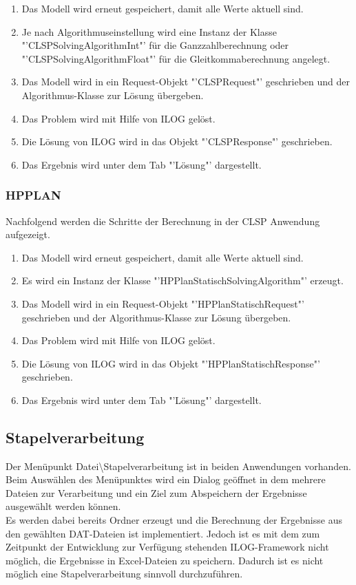 \documentclass[12pt,a4paper, listof=entryprefix, bibliography=totocnumbered,toc=listofnumbered,lof=listofnumbered]{scrartcl}
\begin{document}
\begin{enumerate}
	\item Das Modell wird erneut gespeichert, damit alle Werte aktuell sind.
	\item Je nach Algorithmuseinstellung wird eine Instanz der Klasse "'CLSPSolvingAlgorithmInt"' für die Ganzzahlberechnung oder "'CLSPSolvingAlgorithmFloat"' für die Gleitkommaberechnung angelegt.
	\item Das Modell wird in ein Request-Objekt "'CLSPRequest"' geschrieben und der Algorithmus-Klasse zur Lösung übergeben.
	\item Das Problem wird mit Hilfe von ILOG gelöst.
	\item Die Lösung von ILOG wird in das Objekt "'CLSPResponse"' geschrieben.
	\item Das Ergebnis wird unter dem Tab "'Lösung"' dargestellt.
\end{enumerate}

\subsubsection{HPPLAN}
Nachfolgend werden die Schritte der Berechnung in der CLSP Anwendung aufgezeigt.

\begin{enumerate}
	\item Das Modell wird erneut gespeichert, damit alle Werte aktuell sind.
	\item Es wird ein Instanz der Klasse "'HPPlanStatischSolvingAlgorithm"' erzeugt.
	\item Das Modell wird in ein Request-Objekt "'HPPlanStatischRequest"' geschrieben und der Algorithmus-Klasse zur Lösung übergeben.
	\item Das Problem wird mit Hilfe von ILOG gelöst.
	\item Die Lösung von ILOG wird in das Objekt "'HPPlanStatischResponse"' geschrieben.
	\item Das Ergebnis wird unter dem Tab "'Lösung"' dargestellt.
\end{enumerate}


\subsection{Stapelverarbeitung}
Der Menüpunkt Datei\textbackslash Stapelverarbeitung ist in beiden Anwendungen vorhanden. Beim Auswählen des Menüpunktes wird ein Dialog geöffnet in dem mehrere Dateien zur Verarbeitung und ein Ziel zum Abspeichern der Ergebnisse ausgewählt werden können.
\\
Es werden dabei bereits Ordner erzeugt und die Berechnung der Ergebnisse aus den gewählten DAT-Dateien ist implementiert. Jedoch ist es mit dem zum Zeitpunkt der Entwicklung zur Verfügung stehenden ILOG-Framework nicht möglich, die Ergebnisse in Excel-Dateien zu speichern. Dadurch ist es nicht möglich eine Stapelverarbeitung sinnvoll durchzuführen.
\end{document}
